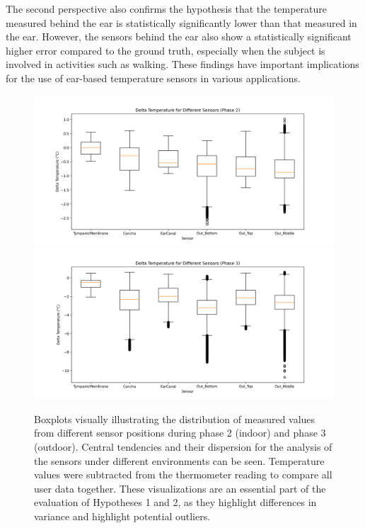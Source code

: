 The second perspective also confirms the hypothesis that the temperature measured behind the ear is statistically significantly lower than that measured in the ear. 
However, the sensors behind the ear also show a statistically significant higher error compared to the ground truth, especially when the subject is involved in activities such as walking. 
These findings have important implications for the use of ear-based temperature sensors in various applications.

\begin{figure}[!h]
    \centering
    \includegraphics[width=\textwidth]{thesis-doc/images/study1/hypothesis1/hypothesis1_boxplot_phase_2.png}
    \includegraphics[width=\textwidth]{thesis-doc/images/study1/hypothesis1/hypothesis1_boxplot_phase_3.png}
    \caption{Boxplots visually illustrating the distribution of measured values from different sensor positions during phase 2 (indoor) and phase 3 (outdoor). Central tendencies and their dispersion for the analysis of the sensors under different environments can be seen. Temperature values were subtracted from the thermometer reading to compare all user data together. These visualizations are an essential part of the evaluation of Hypotheses 1 and 2, as they highlight differences in variance and highlight potential outliers.}
    \label{fig:eval:study1:hypothesis1_result}
\end{figure}

